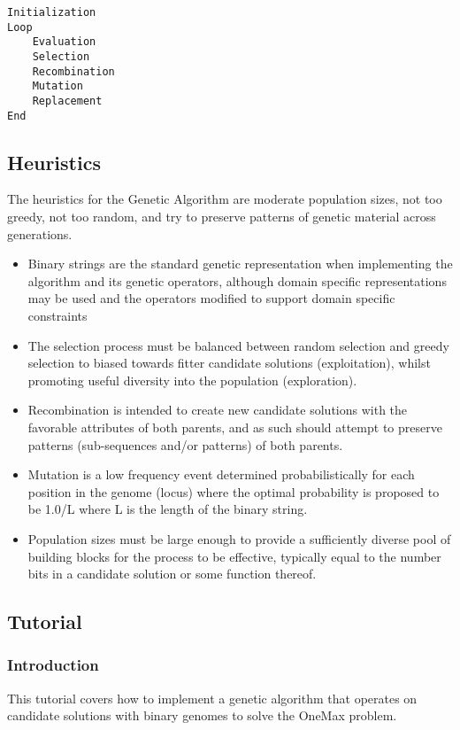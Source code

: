 \begin{lstlisting}
Initialization
Loop 
	Evaluation
	Selection
	Recombination
	Mutation
	Replacement
End
\end{lstlisting}

\subsection{Heuristics}
The heuristics for the Genetic Algorithm are moderate population sizes, not too greedy, not too random, and try to preserve patterns of genetic material across generations.

\begin{itemize}
	\item Binary strings are the standard genetic representation when implementing the algorithm and its genetic operators, although domain specific representations may be used and the operators modified to support domain specific constraints
	\item The selection process must be balanced between random selection and greedy selection to biased towards fitter candidate solutions (exploitation), whilst promoting useful diversity into the population (exploration). 
	\item Recombination is intended to create new candidate solutions with the favorable attributes of both parents, and as such should attempt to preserve patterns (sub-sequences and/or patterns) of both parents.
	\item Mutation is a low frequency event determined probabilistically for each position in the genome (locus) where the optimal probability is proposed to be 1.0/L where L is the length of the binary string.
	\item Population sizes must be large enough to provide a sufficiently diverse pool of building blocks for the process to be effective, typically equal to the number bits in a candidate solution or some function thereof.
\end{itemize}

\subsection{Tutorial}

\subsubsection{Introduction}
This tutorial covers how to implement a genetic algorithm that operates on candidate solutions with binary genomes to solve the OneMax problem.

